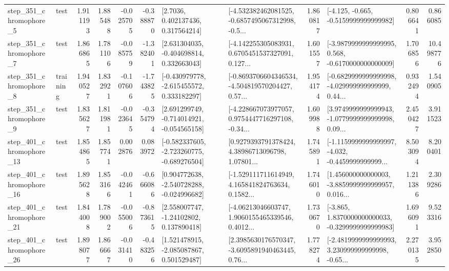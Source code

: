 \begin{tabular}{llrrrrllrlrr}
   step\_351\_chromophore\_5 &      test &      1.911193 &    1.885488 &     -0.025705 & -0.388870 &          [2.7036, 0.402137436, 0.317564214] &  [-4.532382462081525, -0.6857495067312998, -0.5... &       1.860817 &              [-4.125, -0.665, -0.5159999999999982] &            0.806641 &          0.866085 \\
   step\_351\_chromophore\_7 &      test &      1.866865 &    1.781106 &     -0.085759 & -1.382401 &    [2.631304035, -0.404698814, 0.332663043] &  [-4.142255305083931, 0.6705451537327091, 0.127... &       1.601557 &  [-3.9879999999999995, 0.568, -0.6170000000000009] &            1.706856 &         10.498776 \\
   step\_351\_chromophore\_8 &  training &      1.940527 &    1.832921 &     -0.107606 & -1.743825 &   [-0.430979778, -2.615455572, 0.333182297] &  [-0.8693706604346534, -4.504819570204427, 0.57... &       1.954174 &  [-0.6829999999999998, -4.029999999999999, 0.44... &            0.932494 &          1.540905 \\
   step\_351\_chromophore\_9 &      test &      1.835627 &    1.811981 &     -0.023645 & -0.354794 &   [2.691299749, -0.714014921, -0.054565158] &  [-4.228667073977057, 0.9754447716297108, -0.34... &       1.609988 &  [3.9749999999999943, -1.0779999999999998, 0.09... &            2.450427 &          3.911523 \\
  step\_401\_chromophore\_13 &      test &      1.854865 &    1.857741 &      0.002876 &  0.083972 &  [-0.582337605, -2.723260775, -0.689276504] &  [0.9279393791378424, 4.38986713096798, 1.07801... &       1.745891 &  [-1.1159999999999997, -4.032, -0.4459999999999... &            8.503094 &          8.200401 \\
  step\_401\_chromophore\_16 &      test &      1.895628 &    1.853166 &     -0.042461 & -0.666086 &   [0.904772638, -2.540728288, -0.024996682] &  [-1.529111711614949, 4.165841824763634, 0.1582... &       1.746010 &  [1.456000000000003, -3.8859999999999957, 0.016... &            1.211386 &          2.309286 \\
  step\_401\_chromophore\_21 &      test &      1.844008 &    1.789002 &     -0.055006 & -0.873615 &     [2.558007747, -1.24102802, 0.137890418] &  [-4.06213046603747, 1.9060155465339546, 0.4012... &       1.730670 &  [-3.865, 1.8370000000000033, -0.3299999999999983] &            1.696091 &          9.523316 \\
  step\_401\_chromophore\_26 &      test &      1.898077 &    1.866667 &     -0.031410 & -0.483256 &    [1.521478915, -2.085087867, 0.501529487] &  [2.3985630176570347, -3.6095891940463445, 0.76... &       1.778274 &  [-2.4819999999999993, 3.230999999999998, -0.65... &            2.270135 &          3.952850 \\

\end{tabular}

